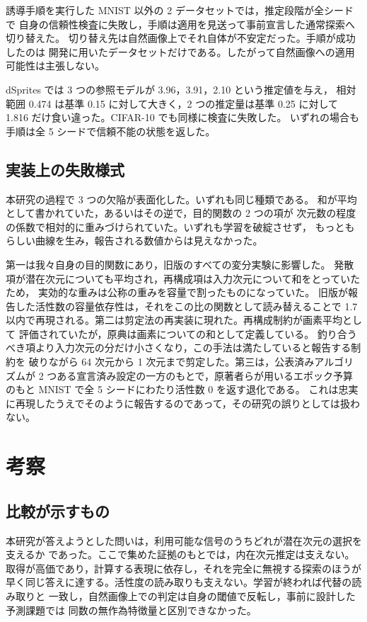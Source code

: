 \documentclass[11pt,a4paper]{jsarticle}
\begin{document}
誘導手順を実行した MNIST 以外の 2 データセットでは，推定段階が全シードで
自身の信頼性検査に失敗し，手順は適用を見送って事前宣言した通常探索へ切り替えた。
切り替え先は自然画像上でそれ自体が不安定だった。手順が成功したのは
開発に用いたデータセットだけである。したがって自然画像への適用可能性は主張しない。

dSprites では 3 つの参照モデルが 3.96，3.91，2.10 という推定値を与え，
相対範囲 0.474 は基準 0.15 に対して大きく，2 つの推定量は基準 0.25 に対して
1.816 だけ食い違った。CIFAR-10 でも同様に検査に失敗した。
いずれの場合も手順は全 5 シードで信頼不能の状態を返した。

\subsection{実装上の失敗様式}\label{sec:res_failures}

本研究の過程で 3 つの欠陥が表面化した。いずれも同じ種類である。
和が平均として書かれていた，あるいはその逆で，目的関数の 2 つの項が
次元数の程度の係数で相対的に重みづけられていた。いずれも学習を破綻させず，
もっともらしい曲線を生み，報告される数値からは見えなかった。

第一は我々自身の目的関数にあり，旧版のすべての変分実験に影響した。
発散項が潜在次元についても平均され，再構成項は入力次元について和をとっていたため，
実効的な重みは公称の重みを容量で割ったものになっていた。
旧版が報告した活性数の容量依存性は，それをこの比の関数として読み替えることで
1.7 以内で再現される。第二は剪定法の再実装に現れた。再構成制約が画素平均として
評価されていたが，原典は画素についての和として定義している。
釣り合うべき項より入力次元の分だけ小さくなり，この手法は満たしていると報告する制約を
破りながら 64 次元から 1 次元まで剪定した。第三は，公表済みアルゴリズムが
2 つある宣言済み設定の一方のもとで，原著者らが用いるエポック予算のもと
MNIST で全 5 シードにわたり活性数 0 を返す退化である。
これは忠実に再現したうえでそのように報告するのであって，その研究の誤りとしては扱わない。

\section{考察}\label{sec:discussion}

\subsection{比較が示すもの}\label{sec:disc_main}

本研究が答えようとした問いは，利用可能な信号のうちどれが潜在次元の選択を支えるか
であった。ここで集めた証拠のもとでは，内在次元推定は支えない。
取得が高価であり，計算する表現に依存し，それを完全に無視する探索のほうが
早く同じ答えに達する。活性度の読み取りも支えない。学習が終われば代替の読み取りと
一致し，自然画像上での判定は自身の閾値で反転し，事前に設計した予測課題では
同数の無作為特徴量と区別できなかった。
\end{document}
